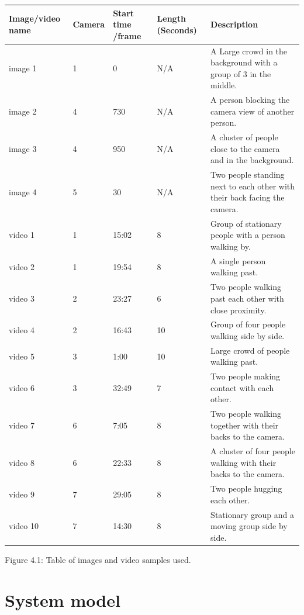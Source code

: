 \documentclass[12pt]{report}
\begin{document}
\begin{center}
\footnotesize
	\begin{tabular}{|p{2.2cm}|l|p{1.8cm}|p{2cm}|p{5cm}|}
		\hline
		Image/video name & Camera & Start time /frame & Length (Seconds) & Description \\
		\hline
		image 1 & 1 & 0 & N/A & A Large crowd in the background with a group of 3 in the middle. \\
		\hline
		image 2 & 4 & 730 & N/A & A person blocking the camera view of another person. \\
		\hline
		image 3 & 4 & 950 & N/A & A cluster of people close to the camera and in the background. \\
		\hline
		image 4 & 5 & 30 & N/A & Two people standing next to each other with their back facing the camera. \\
		\hline
		video 1 & 1 & 15:02 & 8 & Group of stationary people with a person walking by. \\
		\hline
		video 2 & 1 & 19:54 & 8 & A single person walking past. \\
		\hline
		video 3 & 2 & 23:27 & 6 & Two people walking past each other with close proximity. \\
		\hline
		video 4 & 2 & 16:43 & 10 & Group of four people walking side by side. \\
		\hline
		video 5 & 3 & 1:00 & 10 & Large crowd of people walking past. \\
		\hline
		video 6 & 3 & 32:49 & 7 & Two people making contact with each other. \\ 
		\hline
		video 7 & 6 & 7:05 & 8 & Two people walking together with their backs to the camera. \\
		\hline
		video 8 & 6 & 22:33 & 8 & A cluster of four people walking with their backs to the camera. \\
		\hline 
		video 9 & 7 & 29:05 & 8 & Two people hugging each other. \\
		\hline
		video 10 & 7 & 14:30 & 8 & Stationary group and a moving group side by side. \\
		\hline
	\end{tabular}

\vspace{2mm}

{\footnotesize Figure 4.1: Table of images and video samples used.}

\end{center}

\section{System model}
\end{document}
